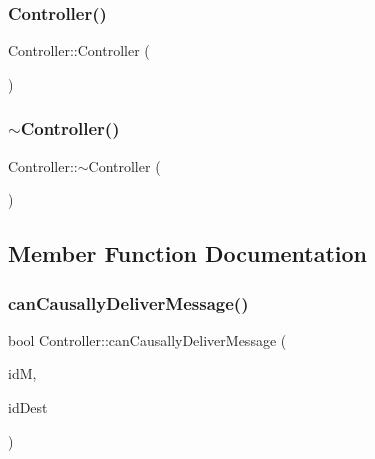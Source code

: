 \subsubsection{\texorpdfstring{Controller()}{Controller()}}
{\footnotesize\ttfamily Controller\+::\+Controller (\begin{DoxyParamCaption}{ }\end{DoxyParamCaption})}

\mbox{\label{classController_a0ab87934c4f7a266cfdb86e0f36bc1b5}} 
\subsubsection{\texorpdfstring{$\sim$\+Controller()}{~Controller()}}
{\footnotesize\ttfamily Controller\+::$\sim$\+Controller (\begin{DoxyParamCaption}{ }\end{DoxyParamCaption})\hspace{0.3cm}{\ttfamily [virtual]}}



\subsection{Member Function Documentation}
\mbox{\label{classController_ab57c4459f002be63b4deda1d7c3c3e29}} 
\subsubsection{\texorpdfstring{can\+Causally\+Deliver\+Message()}{canCausallyDeliverMessage()}}
{\footnotesize\ttfamily bool Controller\+::can\+Causally\+Deliver\+Message (\begin{DoxyParamCaption}\item[{\hyperlink{structures_8h_a83a1d9a070efa5341da84cfd8e28d3e5}{id\+Msg}}]{idM,  }\item[{unsigned int}]{id\+Dest }\end{DoxyParamCaption})}

\mbox{\label{classController_ab250759d5c511ceb8f35fdf9e42583cd}} 
